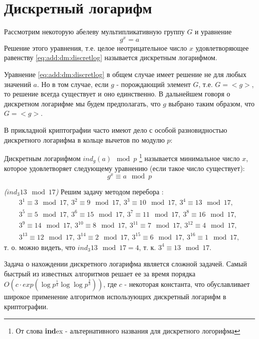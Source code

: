 \section{Дискретный логарифм}
\label{AddDiscretLog}

\begin{definition}
Рассмотрим некоторую абелеву мультипликативную группу $G$ и уравнение 
\begin{equation}
g^x = a
\label{eq:add:dm:discretlog}
\end{equation}
Решение этого уравнения, т.е. целое неотрицательное число $x$
удовлетворяющее равенству \eqref{eq:add:dm:discretlog} называется
дискретным логарифмом.
\end{definition}

Уравнение \eqref{eq:add:dm:discretlog} в общем случае имеет решение не
для любых значений $a$. Но в том случае, если $g$ - порождающий
элемент $G$, т.е. $G=<g>$, то решение всегда существует и оно
единственно. В дальнейшем говоря о дискретном логарифме мы будем
предполагать, что $g$ выбрано таким образом, что $G=<g>$.

В прикладной криптографии часто имеют дело с особой разновидностью
дискретного логарифма в кольце вычетов по модулю $p$:
\begin{definition}
Дискретным логарифмом $ind_g\left(a\right) \mod{p}$
\footnote{От слова {\bf ind}ex - альтернативного названия для дискретного логорифма}
называется
минимальное число $x$, которое удовлетворяет следующему уравнению
(если такое число существует): 
\begin{equation}
g^x \equiv a \mod{p}
\end{equation}
\end{definition}

\begin{example}
\emph{($ind_3{13} \mod{17}$)}
Решим задачу методом перебора \cite{bWikiDiscretLog}:
\begin{eqnarray}
3^1 \equiv 3 \mod{17},\: 
3^2 \equiv 9 \mod{17},\: 
3^3 \equiv 10 \mod{17},\:
3^4 \equiv 13 \mod{17}, 
\nonumber \\
3^5 \equiv 5 \mod{17},\: 
3^6 \equiv 15 \mod{17},\: 
3^7 \equiv 11 \mod{17},\: 
3^8 \equiv 16 \mod{17}, 
\nonumber \\
3^9 \equiv 14 \mod{17},\: 
3^{10} \equiv 8 \mod{17},\: 
3^{11} \equiv 7 \mod{17},\: 
3^{12} \equiv 4 \mod{17}, 
\nonumber \\
3^{13} \equiv 12 \mod{17},\: 
3^{14} \equiv 2 \mod{17},\:
3^{15} \equiv 6 \mod{17},\: 
3^{16} \equiv 1 \mod{17},
\nonumber
\end{eqnarray}
т. о. можно видеть, что $ind_3{13} \mod{17} = 4$, 
т. к. $3^4 \equiv 13 \mod{17}$. 
\label{ex:dm:discretlog}
\end{example}

Задача о нахождении дискретного логарифма является сложной
задачей. Самый быстрый из известных алгоритмов
\cite{bGordon93discretelogarithms} решает ее за время порядка 
\(
O\left(c \cdot
exp\left(\log{p}^{\frac{1}{3}}\log{\log{p}}^{\frac{2}{3}}
\right)\right)
\), где $c$ - некоторая константа,
что обуславливает широкое применение алгоритмов использующих
дискретный логарифм в криптографии.
